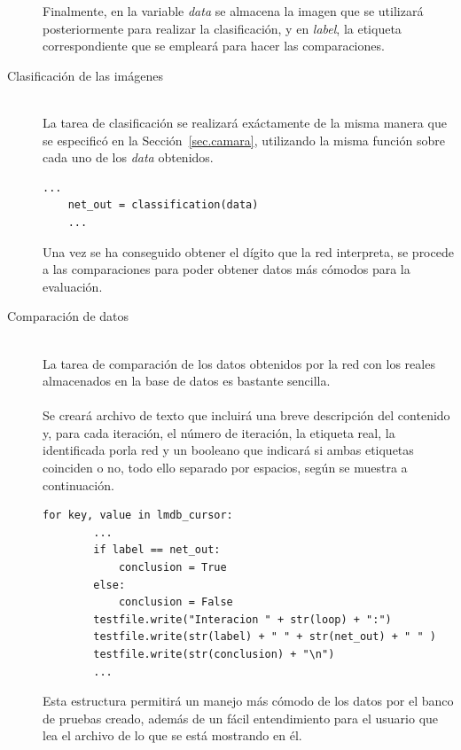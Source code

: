 \begin{description}
	Finalmente, en la variable \textit{data} se almacena la imagen que se utilizará posteriormente para realizar la clasificación, y en \textit{label}, la etiqueta correspondiente que se empleará para hacer las comparaciones.
	\vspace{20pt}
	\item[Clasificación de las imágenes] \hfill 
	\vspace{5pt}
	\\
	La tarea de clasificación se realizará exáctamente de la misma manera que se especificó en la Sección~\ref{sec.camara}, utilizando la misma función sobre cada uno de los \textit{data} obtenidos.
	\vspace{10pt}
	\begin{lstlisting}[frame=single]
	...
	net_out = classification(data)
	...
	\end{lstlisting}
	
	Una vez se ha conseguido obtener el dígito que la red interpreta, se procede a las comparaciones para poder obtener datos más cómodos para la evaluación.
	\vspace{5pt}
	\item[Comparación de datos] \hfill 
	\vspace{5pt}
	\\
	La tarea de comparación de los datos obtenidos por la red con los reales almacenados en la base de datos es bastante sencilla. \\
	\vspace{-10pt}
	\\
	Se creará archivo de texto que incluirá una breve descripción del contenido y, para cada iteración, el número de iteración, la etiqueta real, la identificada porla red y un booleano que indicará si ambas etiquetas coinciden o no, todo ello separado por espacios, según se muestra a continuación.
	\vspace{10pt}
	\begin{lstlisting}[frame=single]
	for key, value in lmdb_cursor:
		...
		if label == net_out:
			conclusion = True
		else:
			conclusion = False
		testfile.write("Interacion " + str(loop) + ":")
		testfile.write(str(label) + " " + str(net_out) + " " )
		testfile.write(str(conclusion) + "\n")
		...
	\end{lstlisting}
	
	Esta estructura permitirá un manejo más cómodo de los datos por el banco de pruebas creado, además de un fácil entendimiento para el usuario que lea el archivo de lo que se está mostrando en él.
\end{description}

